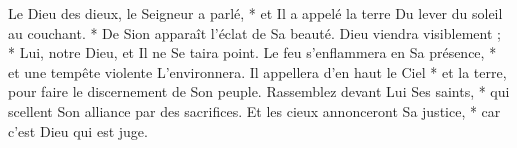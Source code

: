  Le Dieu des dieux, le Seigneur a parlé, * et Il a appelé la terre
\versseparator
 Du lever du soleil au couchant. * De Sion apparaît l'éclat de Sa beauté.
\versseparator
 Dieu viendra visiblement ; * Lui, notre Dieu, et Il ne Se taira point.
\versseparator
 Le feu s'enflammera en Sa présence, * et une tempête violente L'environnera.
\versseparator
 Il appellera d'en haut le Ciel * et la terre, pour faire le discernement de Son peuple.
\versseparator
 Rassemblez devant Lui Ses saints, * qui scellent Son alliance par des sacrifices.
\versseparator
 Et les cieux annonceront Sa justice, * car c'est Dieu qui est juge.